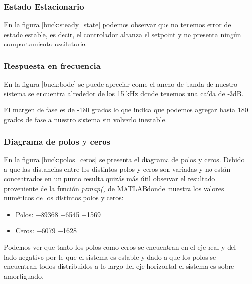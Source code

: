 \documentclass[12pt]{report}
\begin{document}
	\subsubsection{Estado Estacionario}
	
	En la figura \ref{buck:steady_state} podemos observar que no tenemos error de estado estable, es decir, el controlador alcanza el setpoint y no presenta ningún comportamiento oscilatorio.
	
	\subsubsection{Respuesta en frecuencia}

	En la figura \ref{buck:bode} se puede apreciar como el ancho de banda de nuestro sistema se encuentra alrededor de los 15 kHz donde tenemos una caída de -3dB.
	
	El margen de fase es de -180 grados lo que indica que podemos agregar hasta 180 grados de fase a nuestro sistema sin volverlo inestable.
	
	\subsubsection{Diagrama de polos y ceros}

	En la figura \ref{buck:polos_ceros} se presenta el diagrama de polos y ceros. Debido a que las distancias entre los distintos polos y ceros son variadas y no están concentrados en un punto resulta quizás más útil observar el resultado proveniente de la función \textit{pzmap()} de MATLAB\textregistered donde muestra los valores numéricos de los distintos polos y ceros:
	
	\begin{itemize}
		\item Polos:
			\subitem \num{-89368}
			\subitem \num{-6545}
			\subitem \num{-1569}
		\item Ceros:
			\subitem \num{-6079}
			\subitem \num{-1628}
	\end{itemize}
	
	Podemos ver que tanto los polos como ceros se encuentran en el eje real y del lado negativo por lo que el sistema es estable y dado a que los polos se encuentran todos distribuidos a lo largo del eje horizontal el sistema es sobre-amortiguado.
	
\end{document}
